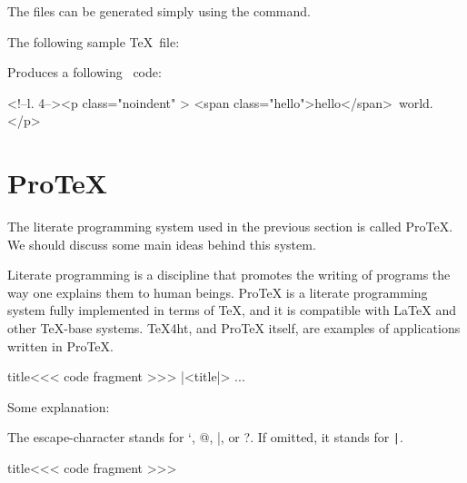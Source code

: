 The  files can be generated simply using the  command.

The following sample \TeX\ file:


Produces a following \HTML\ code:

\begin{htmlsource}
<!--l. 4--><p class="noindent" >
<span class="hello">hello</span> world. 
</p> 
\end{htmlsource}




\section{ProTeX}


The literate programming system used in the previous section is called ProTeX. We should discuss some main ideas behind this system.


Literate programming is a discipline that promotes the writing of programs the
way one explains them to human beings. ProTeX is a literate programming system
fully implemented in terms of TeX, and it is compatible with LaTeX and other
TeX-base systems. TeX4ht, and ProTeX itself, are examples of applications
written in ProTeX.


\begin{texsource}

\<title\><<<
code fragment
>>>  
|<title|>
\OutputCode\<...\> 
\end{texsource}

Some explanation:

\begin{texsource}

\end{texsource}

The escape-character stands for `, @, |, or ?. If omitted, it stands for \verb'|'. 

\begin{texsource}
\<title\><<<
code fragment
>>>

\end{texsource}

